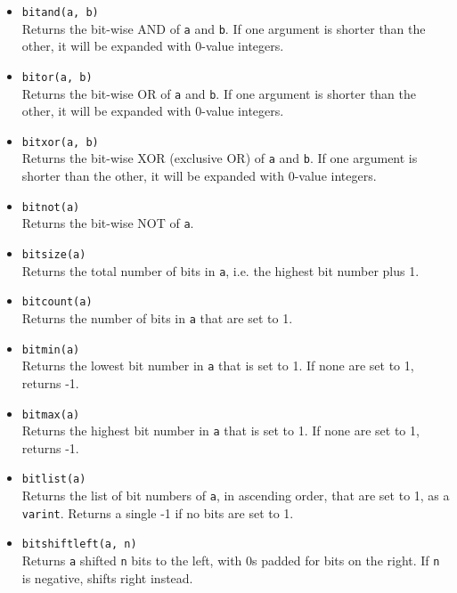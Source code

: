 \begin{itemize}
  \item \verb`bitand(a, b)` \\
    Returns the bit-wise AND of \verb`a` and \verb`b`.  If one
    argument is shorter than the other, it will be expanded with
    0-value integers.

  \item \verb`bitor(a, b)` \\
    Returns the bit-wise OR of \verb`a` and \verb`b`.  If one argument
    is shorter than the other, it will be expanded with 0-value integers.

  \item \verb`bitxor(a, b)` \\
    Returns the bit-wise XOR (exclusive OR) of \verb`a` and \verb`b`.
    If one argument is shorter than the other, it will be expanded with
    0-value integers.

  \item \verb`bitnot(a)` \\
    Returns the bit-wise NOT of \verb`a`.

  \item \verb`bitsize(a)` \\
    Returns the total number of bits in \verb`a`, i.e. the highest
    bit number plus 1.

  \item \verb`bitcount(a)` \\
    Returns the number of bits in \verb`a` that are set to 1.

  \item \verb`bitmin(a)` \\
    Returns the lowest bit number in \verb`a` that is set to 1.
    If none are set to 1, returns -1.

  \item \verb`bitmax(a)` \\
    Returns the highest bit number in \verb`a` that is set to 1.
    If none are set to 1, returns -1.

  \item \verb`bitlist(a)` \\
    Returns the list of bit numbers of \verb`a`, in ascending order,
    that are set to 1, as a \verb`varint`.  Returns a single -1 if
    no bits are set to 1.

  \item \verb`bitshiftleft(a, n)` \\
    Returns \verb`a` shifted \verb`n` bits to the left, with 0s padded
    for bits on the right.  If \verb`n` is negative, shifts right instead.


\end{itemize}

